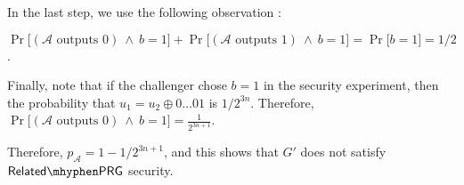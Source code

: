 \documentclass[10pt,addpoints]{exam}
\newcommand{\prob}[1]{\Pr\Big[ #1 \Big]}
\newcommand{\calA}{\mathcal{A}}
\theoremstyle{definition}
\newcommand{\relatedprg}{\mathsf{Related\mhyphen PRG}}
\begin{document}
\begin{enumerate}
    In the last step, we use the following observation :

    $\prob{\left(\calA \text{ outputs }0 \right) ~ \wedge ~ b=1} + \prob{\left(\calA \text{ outputs }1 \right) ~ \wedge ~ b=1} = \prob{b=1} = 1/2$. 

    \vspace{5pt}

    Finally, note that if the challenger chose $b=1$ in the security experiment, then the probability that $u_1 = u_2 \oplus 0\ldots01$ is $1/2^{3n}$. Therefore, 
    $\prob{\left(\calA \text{ outputs }0 \right) ~ \wedge ~ b=1} = \frac{1}{2^{3n+1}}$.  

    \vspace{5pt}

    Therefore, $p_{\calA} = 1-1/2^{3n+1}$, and this shows that $G'$ does not satisfy $\relatedprg$ security. 

\end{enumerate}
\end{document}
